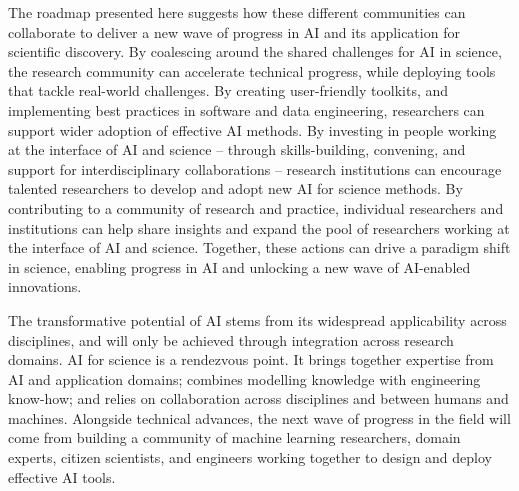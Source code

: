 The roadmap presented here suggests how these different communities can
collaborate to deliver a new wave of progress in AI and its application
for scientific discovery. By coalescing around the shared challenges for
AI in science, the research community can accelerate technical progress,
while deploying tools that tackle real-world challenges. By creating
user-friendly toolkits, and implementing best practices in software and
data engineering, researchers can support wider adoption of effective AI
methods. By investing in people working at the interface of AI and
science -- through skills-building, convening, and support for
interdisciplinary collaborations -- research institutions can encourage
talented researchers to develop and adopt new AI for science methods. By
contributing to a community of research and practice, individual
researchers and institutions can help share insights and expand the pool
of researchers working at the interface of AI and science. Together,
these actions can drive a paradigm shift in science, enabling progress
in AI and unlocking a new wave of AI-enabled innovations.

The transformative potential of AI stems from its widespread
applicability across disciplines, and will only be achieved through
integration across research domains. AI for science is a rendezvous
point. It brings together expertise from AI and application domains;
combines modelling knowledge with engineering know-how; and relies on
collaboration across disciplines and between humans and machines.
Alongside technical advances, the next wave of progress in the field
will come from building a community of machine learning researchers,
domain experts, citizen scientists, and engineers working together to
design and deploy effective AI tools.
